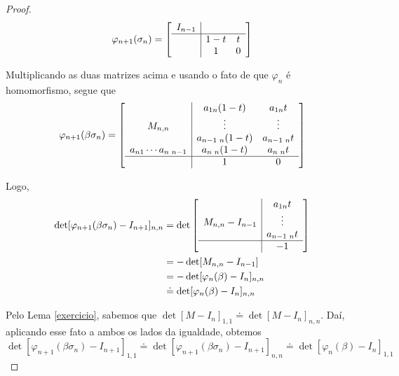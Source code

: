 \documentclass[a4paper,portuguese,11pt,twoside, leqno]{book}
\theoremstyle{definition}
\begin{document}
\begin{proof}
		\begin{equation*}
		\varphi_{n+1}(\sigma_n) = \left[\begin{array}{c|cc}
		I_{n-1} & & \\
		\hline
		& 1-t & t \\
		& 1 & 0
		\end{array}\right]
		\end{equation*}
		\par\vspace{0.3cm} Multiplicando as duas matrizes acima e usando o fato de que $\varphi_n$  é homomorfismo, segue que
		\begin{equation*}
		\varphi_{n+1}(\beta\sigma_n) = \left[\begin{array}{c|cc}
		& a_{1n}(1-t) & a_{1n}t \\
		M_{n,n} & \vdots & \vdots \\
		& a_{n-1\text{ }n}(1-t) & a_{n-1\text{ }n}t \\
		a_{n1}\cdots a_{n\text{ }n-1} & a_{n\text{ }n}(1-t) & a_{n\text{ }n}t \\
		\hline 
		& 1 & 0
		\end{array}\right]
		\end{equation*}
		\par\vspace{0.3cm} Logo,
		\begin{align*}
		\det[\varphi_{n+1}(\beta\sigma_n) - I_{n+1}]_{n,n} &= \det\left[\begin{array}{c|c}
		& a_{1n}t \\
		M_{n,n} - I_{n-1} & \vdots \\
		& a_{n-1\text{ }n}t \\
		\hline
		& -1
		\end{array}\right] \\
		&= -\det[M_{n,n} - I_{n-1}] \\
		&= -\det[\varphi_n(\beta) - I_n]_{n,n} \\
		&\doteq \det[\varphi_n(\beta) - I_n]_{n,n} 
		\end{align*} 
		\par\vspace{0.3cm} Pelo Lema \eqref{exercicio}, sabemos que $\det[M-I_n]_{1,1}\doteq\det[M-I_n]_{n,n}$. Daí, aplicando esse fato a ambos os lados da igualdade, obtemos
		\begin{equation*}
		\det[\varphi_{n+1}(\beta\sigma_n) - I_{n+1}]_{1,1}\doteq\det[\varphi_{n+1}(\beta\sigma_n) - I_{n+1}]_{n,n}\doteq\det[\varphi_n(\beta) - I_n]_{1,1}
		\end{equation*}

\end{proof}
\end{document}
